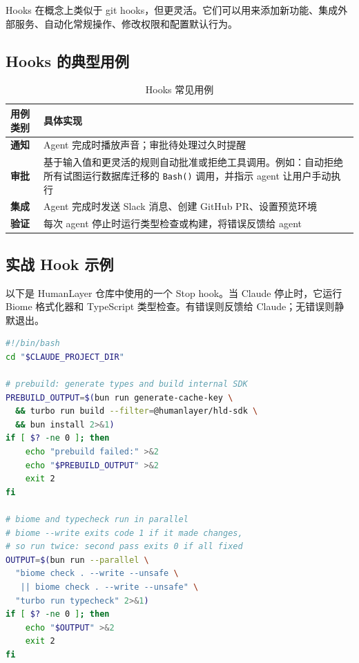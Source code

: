 \documentclass[a4paper]{article}
\begin{document}
Hooks 在概念上类似于 git hooks，但更灵活。它们可以用来添加新功能、集成外部服务、自动化常规操作、修改权限和配置默认行为。

\subsection{Hooks 的典型用例}

\begin{table}[H]
\centering
\caption{Hooks 常见用例}
\begin{tabular}{@{}p{3cm}p{10cm}@{}}
\toprule
\textbf{用例类别} & \textbf{具体实现} \\
\midrule
\textbf{通知} & Agent 完成时播放声音；审批待处理过久时提醒 \\
\textbf{审批} & 基于输入值和更灵活的规则自动批准或拒绝工具调用。例如：自动拒绝所有试图运行数据库迁移的 \texttt{Bash()} 调用，并指示 agent 让用户手动执行 \\
\textbf{集成} & Agent 完成时发送 Slack 消息、创建 GitHub PR、设置预览环境 \\
\textbf{验证} & 每次 agent 停止时运行类型检查或构建，将错误反馈给 agent \\
\bottomrule
\end{tabular}
\end{table}

\subsection{实战 Hook 示例}

以下是 HumanLayer 仓库中使用的一个 Stop hook。当 Claude 停止时，它运行 Biome 格式化器和 TypeScript 类型检查。有错误则反馈给 Claude；无错误则静默退出。

\begin{lstlisting}[caption={HumanLayer 的验证 Hook（Stop Hook）},language=bash]
#!/bin/bash
cd "$CLAUDE_PROJECT_DIR"

# prebuild: generate types and build internal SDK
PREBUILD_OUTPUT=$(bun run generate-cache-key \
  && turbo run build --filter=@humanlayer/hld-sdk \
  && bun install 2>&1)
if [ $? -ne 0 ]; then
    echo "prebuild failed:" >&2
    echo "$PREBUILD_OUTPUT" >&2
    exit 2
fi

# biome and typecheck run in parallel
# biome --write exits code 1 if it made changes,
# so run twice: second pass exits 0 if all fixed
OUTPUT=$(bun run --parallel \
  "biome check . --write --unsafe \
   || biome check . --write --unsafe" \
  "turbo run typecheck" 2>&1)
if [ $? -ne 0 ]; then
    echo "$OUTPUT" >&2
    exit 2
fi
\end{lstlisting}
\end{document}

